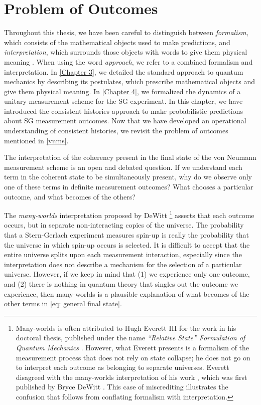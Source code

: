 \section{Problem of Outcomes} \label{problem of outcomes}
Throughout this thesis, we have been careful to distinguish between \textit{formalism}, which consists of the mathematical objects used to make predictions, and \textit{interpretation}, which surrounds those objects with words to give them physical meaning \cite{baumann}. When using the word \textit{approach}, we refer to a combined formalism and interpretation. In \autoref{Chapter 3}, we detailed the standard approach to quantum mechanics by describing its postulates, which prescribe mathematical objects and give them physical meaning. In \autoref{Chapter 4}, we formalized the dynamics of a unitary measurement scheme for the SG experiment. In this chapter, we have introduced the consistent histories approach to make probabilistic predictions about SG measurement outcomes. Now that we have developed an operational understanding of consistent histories, we revisit the problem of outcomes mentioned in \autoref{vnms}.

The interpretation of the coherency present in the final state of the von Neumann measurement scheme \label{eq: general final state} is an open and debated question. If we understand each term in the coherent state to be simultaneously present, why do we observe only one of these terms in definite measurement outcomes? What chooses a particular outcome, and what becomes of the others?

The \textit{many-worlds} interpretation proposed by DeWitt \footnote{Many-worlds is often attributed to Hugh Everett III for the work in his doctoral thesis, published under the name \textit{``Relative State'' Formulation of Quantum Mechanics} \cite{everett}. However, what Everett presents is a formalism of the measurement process that does not rely on state collapse; he does not go on to interpret each outcome as belonging to separate universes. Everett disagreed with the many-worlds interpretation of his work \cite{barrett}, which was first published by Bryce DeWitt \cite{dewitt}. This case of miscrediting illustrates the confusion that follows from conflating formalism with interpretation.} asserts that each outcome occurs, but in separate non-interacting copies of the universe. The probability that a Stern-Gerlach experiment measures spin-up is really the probability that the universe in which spin-up occurs is selected. It is difficult to accept that the entire universe splits upon each measurement interaction, especially since the interpretation does not describe a mechanism for the selection of a particular universe. However, if we keep in mind that (1) we experience only one outcome, and (2) there is nothing in quantum theory that singles out the outcome we experience, then many-worlds is a plausible explanation of what becomes of the other terms in \autoref{eq: general final state}.

